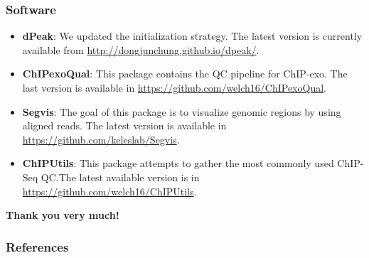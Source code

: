 \documentclass[compress,table,xcolor=dvipsnames]{beamer}\usepackage[]{graphicx}\usepackage[]{color}
\begin{document}
\begin{frame}[t]
\frametitle{Software}  
\begin{itemize}
\item {\color{RoyalBlue}\textbf{dPeak}}: We updated the initialization
  strategy. The latest version is currently available from
  \url{http://dongjunchung.github.io/dpeak/}.
\item {\color{RoyalBlue}\textbf{ChIPexoQual}}: This package contains
  the QC pipeline for ChIP-exo. The last version is available in
  \url{https://github.com/welch16/ChIPexoQual}.
\item {\color{RoyalBlue}\textbf{Segvis}}: The goal of this package is
  to visualize genomic regions by using aligned reads. The latest
  version is available in \url{https://github.com/keleslab/Segvis}.
\item {\color{RoyalBlue}\textbf{ChIPUtils}}: This package attempts to
  gather the most commonly used ChIP-Seq QC.The latest available
  version is in \url{https://github.com/welch16/ChIPUtils}.
\end{itemize}

\end{frame}

\begin{frame}[plain]
  
{\Huge
{\color{RoyalBlue}
\begin{center}
  \textbf{Thank you very much!}
\end{center}
}
}


\end{frame}

\begin{frame}
  \frametitle{References}

{\tiny

\nocite{exo1}
\nocite{dpeak}



}

\end{frame}
\end{document}
